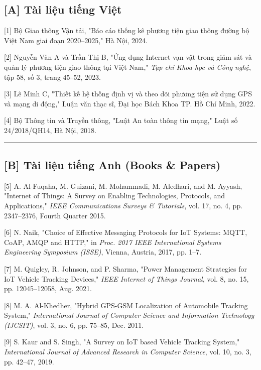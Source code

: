 \documentclass[a4paper]{extarticle}
\begin{document}
\subsection{{[}A{]} Tài liệu tiếng
Việt}\label{a-tuxe0i-liux1ec7u-tiux1ebfng-viux1ec7t}

{[}1{]} Bộ Giao thông Vận tải, "Báo cáo thống kê phương tiện giao thông
đường bộ Việt Nam giai đoạn 2020--2025," Hà Nội, 2024.

{[}2{]} Nguyễn Văn A và Trần Thị B, "Ứng dụng Internet vạn vật trong
giám sát và quản lý phương tiện giao thông tại Việt Nam," \emph{Tạp chí
Khoa học và Công nghệ}, tập 58, số 3, trang 45--52, 2023.

{[}3{]} Lê Minh C, "Thiết kế hệ thống định vị và theo dõi phương tiện sử
dụng GPS và mạng di động," Luận văn thạc sĩ, Đại học Bách Khoa TP. Hồ
Chí Minh, 2022.

{[}4{]} Bộ Thông tin và Truyền thông, "Luật An toàn thông tin mạng,"
Luật số 24/2018/QH14, Hà Nội, 2018.

\begin{center}\rule{0.5\linewidth}{0.5pt}\end{center}

\subsection{{[}B{]} Tài liệu tiếng Anh (Books \&
Papers)}\label{b-tuxe0i-liux1ec7u-tiux1ebfng-anh-books--papers}

{[}5{]} A. Al-Fuqaha, M. Guizani, M. Mohammadi, M. Aledhari, and M.
Ayyash, "Internet of Things: A Survey on Enabling Technologies,
Protocols, and Applications," \emph{IEEE Communications Surveys \&
Tutorials}, vol. 17, no. 4, pp. 2347--2376, Fourth Quarter 2015.

{[}6{]} N. Naik, "Choice of Effective Messaging Protocols for IoT
Systems: MQTT, CoAP, AMQP and HTTP," in \emph{Proc. 2017 IEEE
International Systems Engineering Symposium (ISSE)}, Vienna, Austria,
2017, pp. 1--7.

{[}7{]} M. Quigley, R. Johnson, and P. Sharma, "Power Management
Strategies for IoT Vehicle Tracking Devices," \emph{IEEE Internet of
Things Journal}, vol. 8, no. 15, pp. 12045--12058, Aug. 2021.

{[}8{]} M. A. Al-Khedher, "Hybrid GPS-GSM Localization of Automobile
Tracking System," \emph{International Journal of Computer Science and
Information Technology (IJCSIT)}, vol. 3, no. 6, pp. 75--85, Dec. 2011.

{[}9{]} S. Kaur and S. Singh, "A Survey on IoT based Vehicle Tracking
System," \emph{International Journal of Advanced Research in Computer
Science}, vol. 10, no. 3, pp. 42--47, 2019.
\end{document}
